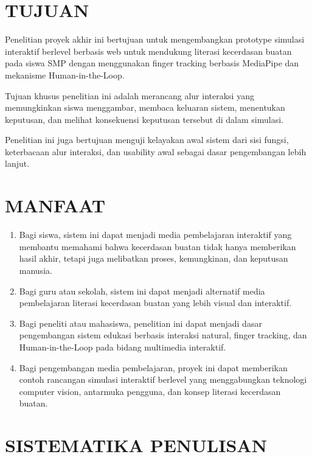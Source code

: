 \documentclass[12pt,oneside]{report}
\begin{document}
\section{TUJUAN}
\label{sec:tujuan}

Penelitian proyek akhir ini bertujuan untuk mengembangkan prototype simulasi interaktif berlevel berbasis web untuk mendukung literasi kecerdasan buatan pada siswa SMP dengan menggunakan finger tracking berbasis MediaPipe dan mekanisme Human-in-the-Loop.

Tujuan khusus penelitian ini adalah merancang alur interaksi yang memungkinkan siswa menggambar, membaca keluaran sistem, menentukan keputusan, dan melihat konsekuensi keputusan tersebut di dalam simulasi.

Penelitian ini juga bertujuan menguji kelayakan awal sistem dari sisi fungsi, keterbacaan alur interaksi, dan usability awal sebagai dasar pengembangan lebih lanjut.

\section{MANFAAT}
\label{sec:manfaat}

\begin{enumerate}
    \item Bagi siswa, sistem ini dapat menjadi media pembelajaran interaktif yang membantu memahami bahwa kecerdasan buatan tidak hanya memberikan hasil akhir, tetapi juga melibatkan proses, kemungkinan, dan keputusan manusia.
    \item Bagi guru atau sekolah, sistem ini dapat menjadi alternatif media pembelajaran literasi kecerdasan buatan yang lebih visual dan interaktif.
    \item Bagi peneliti atau mahasiswa, penelitian ini dapat menjadi dasar pengembangan sistem edukasi berbasis interaksi natural, finger tracking, dan Human-in-the-Loop pada bidang multimedia interaktif.
    \item Bagi pengembangan media pembelajaran, proyek ini dapat memberikan contoh rancangan simulasi interaktif berlevel yang menggabungkan teknologi computer vision, antarmuka pengguna, dan konsep literasi kecerdasan buatan.
\end{enumerate}

\section{SISTEMATIKA PENULISAN}
\label{sec:sistematika-penulisan}
\end{document}
